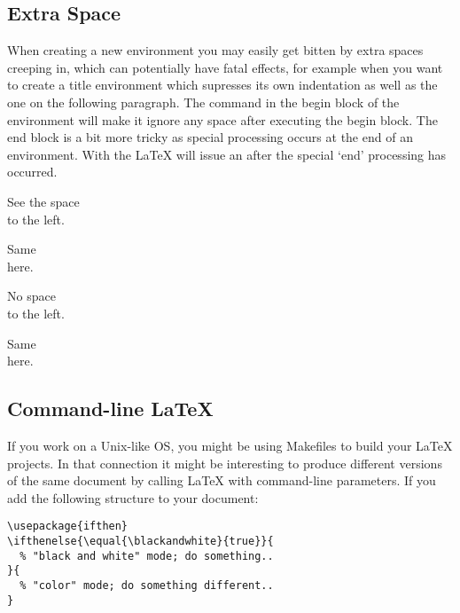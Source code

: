 \subsection{Extra Space}

When creating a new environment you may easily get bitten by extra spaces
creeping in, which can potentially have fatal effects, for example when you
want to create a title environment which supresses its own indentation as
well as the one on the following paragraph. The  command in
the begin block of the environment will make it ignore any space after
executing the begin block. The end block is a bit more tricky as special
processing occurs at the end of an environment. With the
 \LaTeX{} will issue an  after the
special `end' processing has occurred.

\begin{example}
\newenvironment{simple}%
 {\noindent}%
 {\par\noindent}

\begin{simple}
See the space\\to the left.
\end{simple}
Same\\here.
\end{example}

\begin{example}
\newenvironment{correct}%
 {\noindent\ignorespaces}%
 {\par\noindent%
   \ignorespacesafterend}

\begin{correct}
No space\\to the left.
\end{correct}
Same\\here.
\end{example}

\subsection{Command-line \LaTeX}

If you work on a Unix-like OS, you might be using Makefiles to build your
\LaTeX{} projects. In that connection it might be interesting to produce
different versions of the same document by calling \LaTeX{} with command-line
parameters. If you add the following structure to your document:

\begin{verbatim}
\usepackage{ifthen}
\ifthenelse{\equal{\blackandwhite}{true}}{
  % "black and white" mode; do something..
}{
  % "color" mode; do something different..
}
\end{verbatim}

